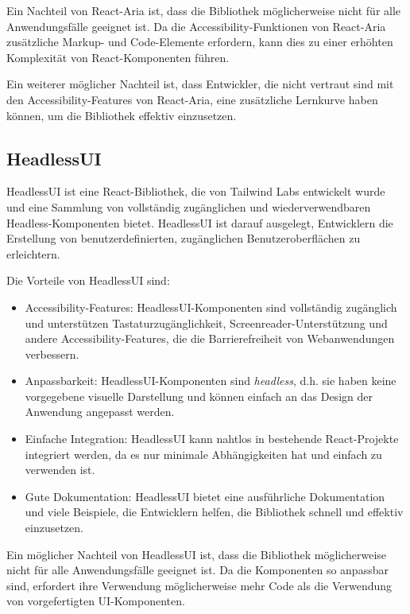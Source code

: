 Ein Nachteil von React-Aria ist, dass die Bibliothek möglicherweise nicht für alle Anwendungsfälle geeignet ist. Da die Accessibility-Funktionen von React-Aria zusätzliche Markup- und Code-Elemente erfordern, kann dies zu einer erhöhten Komplexität von React-Komponenten führen.

Ein weiterer möglicher Nachteil ist, dass Entwickler, die nicht vertraut sind mit den Accessibility-Features von React-Aria, eine zusätzliche Lernkurve haben können, um die Bibliothek effektiv einzusetzen.

\subsection{HeadlessUI}

HeadlessUI ist eine React-Bibliothek, die von Tailwind Labs entwickelt wurde und eine Sammlung von vollständig zugänglichen und wiederverwendbaren Headless-Komponenten bietet. HeadlessUI ist darauf ausgelegt, Entwicklern die Erstellung von benutzerdefinierten, zugänglichen Benutzeroberflächen zu erleichtern.

Die Vorteile von HeadlessUI sind:

\begin{itemize}
    \item Accessibility-Features: HeadlessUI-Komponenten sind vollständig zugänglich und unterstützen Tastaturzugänglichkeit, Screenreader-Unterstützung und andere Accessibility-Features, die die Barrierefreiheit von Webanwendungen verbessern.
    \item Anpassbarkeit: HeadlessUI-Komponenten sind \emph{headless}, d.h. sie haben keine vorgegebene visuelle Darstellung und können einfach an das Design der Anwendung angepasst werden.
    \item Einfache Integration: HeadlessUI kann nahtlos in bestehende React-Projekte integriert werden, da es nur minimale Abhängigkeiten hat und einfach zu verwenden ist.
    \item Gute Dokumentation: HeadlessUI bietet eine ausführliche Dokumentation und viele Beispiele, die Entwicklern helfen, die Bibliothek schnell und effektiv einzusetzen.
\end{itemize}

Ein möglicher Nachteil von HeadlessUI ist, dass die Bibliothek möglicherweise nicht für alle Anwendungsfälle geeignet ist. Da die Komponenten so anpassbar sind, erfordert ihre Verwendung möglicherweise mehr Code als die Verwendung von vorgefertigten UI-Komponenten.

